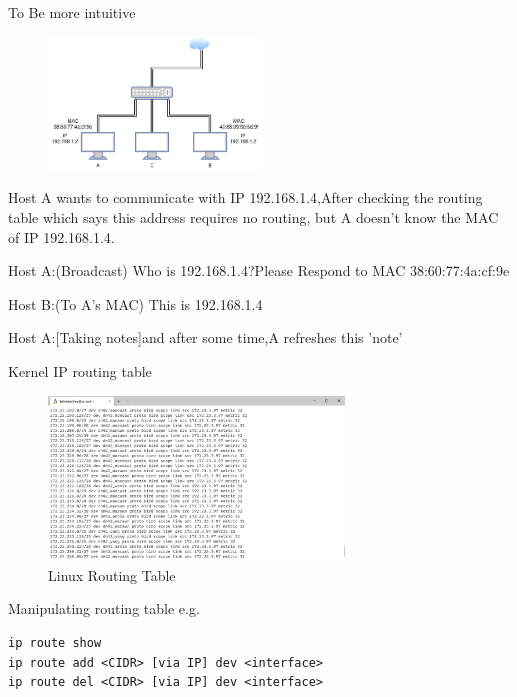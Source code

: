 \documentclass[UTF8]{ctexbeamer}
\begin{document}
\begin{frame}{To Be more intuitive}
\begin{figure}
    \centering
    \includegraphics[width=0.5\textwidth]{ARP.png}
\end{figure}
Host A wants to communicate with IP 192.168.1.4,After checking the routing table which says this address requires no routing,
but A doesn't know the MAC of IP 192.168.1.4.

Host A:(Broadcast) Who is 192.168.1.4?Please Respond to MAC 38:60:77:4a:cf:9e

Host B:(To A's MAC) This is 192.168.1.4

Host A:[Taking notes]and after some time,A refreshes this 'note'

    
\end{frame}

\begin{frame}{Kernel IP routing table}
    \begin{figure}
        \centering
        \includegraphics[width=0.7\textwidth]{linux-routing-table.png}
        \caption{Linux Routing Table}
    \end{figure}
\end{frame}

\begin{frame}[fragile]{Manipulating routing table}
e.g.
\begin{verbatim}
ip route show
ip route add <CIDR> [via IP] dev <interface>
ip route del <CIDR> [via IP] dev <interface>
\end{verbatim}
    
    
\end{frame}
\end{document}
